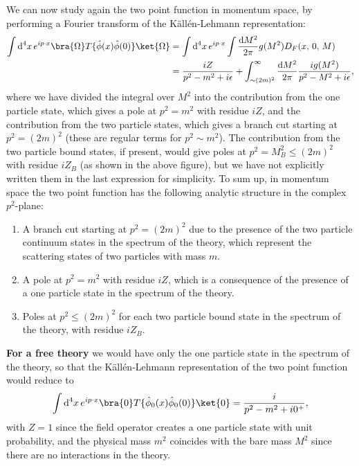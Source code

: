 We can now study again the two point function in momentum space, by performing a Fourier transform of the Källén-Lehmann representation:
\[
    \begin{aligned}
        \int \mathrm{d}^4 x \, e^{ip \cdot x} \bra{\Omega} T \{ \hat{\phi}(x) \hat{\phi}(0) \} \ket{\Omega} & = \int \mathrm{d}^4 x \, e^{ip \cdot x} \int \frac{\mathrm{d} M^2}{2\pi} g(M^2) D_F(x,\,0,\,M)                                        \\
                                                                                                            & = \frac{iZ}{p^2 - m^2 + i \epsilon} + \int_{\sim (2m)^2}^{\infty} \frac{\mathrm{d} M^2}{2\pi} \frac{i g(M^2)}{p^2 - M^2 + i\epsilon},
    \end{aligned}
\]
where we have divided the integral over \(M^2\) into the contribution from the one particle state, which gives a pole at \(p^2 = m^2\) with residue \(iZ\), and the contribution from the two particle states, which gives a branch cut starting at \(p^2 = (2m)^2\) (these are regular terms for \(p^2 \sim m^2\)). The contribution from the two particle bound states, if present, would give poles at \(p^2 = M_B^2 \leq (2m)^2\) with residue \(iZ_B\) (as shown in the above figure), but we have not explicitly written them in the last expression for simplicity. To sum up, in momentum space the two point function has the following analytic structure in the complex \(p^2\)-plane:
\begin{enumerate}
    \item A branch cut starting at \(p^2 = (2m)^2\) due to the presence of the two particle continuum states in the spectrum of the theory, which represent the scattering states of two particles with mass \(m\).
    \item A pole at \(p^2 = m^2\) with residue \(iZ\), which is a consequence of the presence of a one particle state in the spectrum of the theory.
    \item Poles at \(p^2 \leq (2m)^2\) for each two particle bound state in the spectrum of the theory, with residue \(iZ_B\).
\end{enumerate}

\textbf{For a free theory} we would have only the one particle state in the spectrum of the theory, so that the Källén-Lehmann representation of the two point function would reduce to
\[
    \int \mathrm{d}^4 x \, e^{ip \cdot x} \bra{0} T \{ \hat{\phi}_0(x) \hat{\phi}_0(0) \} \ket{0} = \frac{i}{p^2 - m^2 + i 0^+},
\]
with \(Z = 1\) since the field operator creates a one particle state with unit probability, and the physical mass \(m^2\) coincides with the bare mass \(M^2\) since there are no interactions in the theory.

